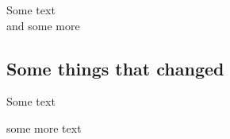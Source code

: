 \documentclass[11pt,letterpaper]{article}
\begin{document}


Some text\\

and some more

\subsection*{Some things that changed}
Some text

\pagebreak

some more text
\end{document}
